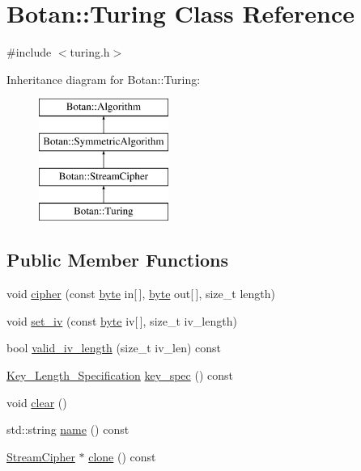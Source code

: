 \hypertarget{classBotan_1_1Turing}{\section{Botan\-:\-:Turing Class Reference}
\label{classBotan_1_1Turing}
}


{\ttfamily \#include $<$turing.\-h$>$}

Inheritance diagram for Botan\-:\-:Turing\-:\begin{figure}[H]
\begin{center}
\leavevmode
\includegraphics[height=4.000000cm]{classBotan_1_1Turing}
\end{center}
\end{figure}
\subsection*{Public Member Functions}
\begin{DoxyCompactItemize}
\item 
void \hyperlink{classBotan_1_1Turing_a336de01480b7ae4d6223001aa6c49bcb}{cipher} (const \hyperlink{namespaceBotan_a7d793989d801281df48c6b19616b8b84}{byte} in\mbox{[}$\,$\mbox{]}, \hyperlink{namespaceBotan_a7d793989d801281df48c6b19616b8b84}{byte} out\mbox{[}$\,$\mbox{]}, size\-\_\-t length)
\item 
void \hyperlink{classBotan_1_1Turing_ac04f4ac9c119ab1ef5f47c4de684b4da}{set\-\_\-iv} (const \hyperlink{namespaceBotan_a7d793989d801281df48c6b19616b8b84}{byte} iv\mbox{[}$\,$\mbox{]}, size\-\_\-t iv\-\_\-length)
\item 
bool \hyperlink{classBotan_1_1Turing_a34da82793efbceb49c5f50d3f6d917ed}{valid\-\_\-iv\-\_\-length} (size\-\_\-t iv\-\_\-len) const 
\item 
\hyperlink{classBotan_1_1Key__Length__Specification}{Key\-\_\-\-Length\-\_\-\-Specification} \hyperlink{classBotan_1_1Turing_ae73b58efc5d9b13dedcf194490a9dd65}{key\-\_\-spec} () const 
\item 
void \hyperlink{classBotan_1_1Turing_ae1c85e9d3ffc19fb4011ae03a2c51d18}{clear} ()
\item 
std\-::string \hyperlink{classBotan_1_1Turing_aa7c74e1702123565237960c5b32eb9ba}{name} () const 
\item 
\hyperlink{classBotan_1_1StreamCipher}{Stream\-Cipher} $\ast$ \hyperlink{classBotan_1_1Turing_aa6cdd53f8d90376519b98917dff4c0fe}{clone} () const 
\end{DoxyCompactItemize}


